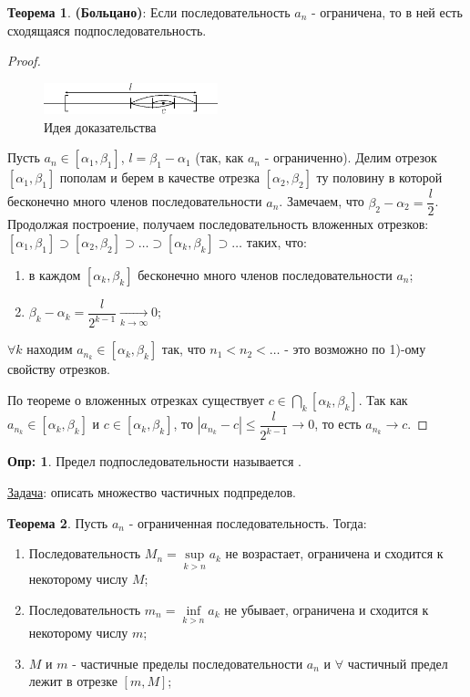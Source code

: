 \documentclass[12pt]{article}
\theoremstyle{definition}
\newtheorem{defn}{Опр:}
\newtheorem{theorem}{Теорема}
\begin{document}
\begin{theorem}
	\textbf{(Больцано)}: Если последовательность $a_n$ - ограничена, то в ней есть сходящаяся подпоследовательность.
\end{theorem}
\begin{proof}
	\begin{figure}[H]
		\centering
		\includegraphics[width=0.45\textwidth]{9_1.eps}
		\caption{Идея доказательства}
		\label{9_1}
	\end{figure}

Пусть $a_n \in [\alpha_1, \beta_1 ]$, $l = \beta_1 - \alpha_1$ (так, как $a_n$ - ограниченно). Делим отрезок $[\alpha_1, \beta_1 ]$ пополам и берем в качестве отрезка $[\alpha_2, \beta_2]$ ту половину в которой бесконечно много членов последовательности $a_n$. Замечаем, что $\beta_2 - \alpha_2 = \dfrac{l}{2}$. Продолжая построение, получаем последовательность вложенных отрезков: $[\alpha_1, \beta_1] \supset [\alpha_2, \beta_2] \supset \dotsc \supset [\alpha_k, \beta_k] \supset \dotsc$ таких, что:

\begin{enumerate}[label={\arabic*)}]
	\item в каждом $[\alpha_k, \beta_k]$ бесконечно много членов последовательности $a_n$;
	\item $\beta_k - \alpha_k = \dfrac{l}{2^{k-1}} \xrightarrow[k \rightarrow \infty]{} 0$;
\end{enumerate}

$\forall k$ находим $a_{n_k} \in [\alpha_k, \beta_k]$ так, что $n_1 < n_2 < \dotsc$ - это возможно по 1)-ому свойству отрезков.

По теореме о вложенных отрезках существует $c \in \bigcap\limits_k [\alpha_k, \beta_k]$. Так как $a_{n_k} \in [\alpha_k, \beta_k]$ и $c \in [\alpha_k, \beta_k]$, то $|a_{n_k}\! - c| \leq \dfrac{l}{2^{k-1}} \rightarrow 0$, то есть $a_{n_k} \rightarrow c$.
\end{proof}

\begin{defn}
	Предел подпоследовательности называется .
\end{defn}

\uline{Задача}: описать множество частичных подпределов.

\begin{theorem}
	Пусть $a_n$ - ограниченная последовательность. Тогда:
	\begin{enumerate}[label={(\arabic*)}]
		\item Последовательность $M_n = \sup\limits_{k>n}a_k$ не возрастает, ограничена и сходится к некоторому числу $M$;
		\item Последовательность $m_n = \inf\limits_{k>n}a_k$ не убывает, ограничена и сходится к некоторому числу $m$;
		\item $M$ и $m$ - частичные пределы последовательности $a_n$ и $\forall$ частичный предел лежит в отрезке $[m, M]$;
	\end{enumerate}
\end{theorem}
\end{document}

